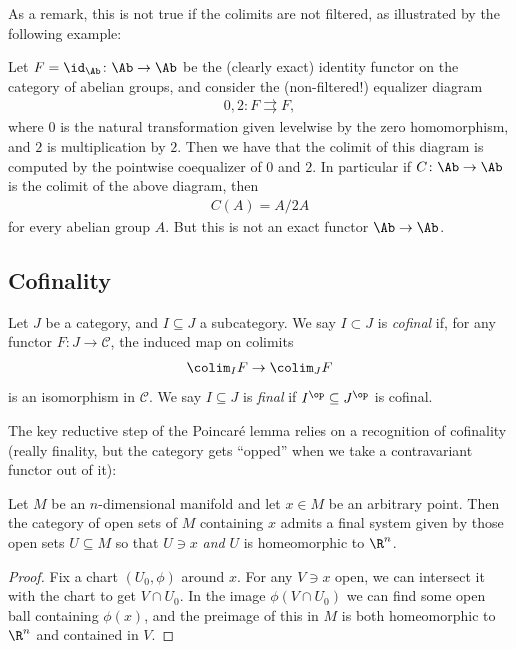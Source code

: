 \documentclass[11pt]{amsart}
\begin{document}
As a remark, this is not true if the colimits are not filtered, as illustrated by the following example:

\begin{example} Let $F = \id_\Ab \colon \Ab \to \Ab$ be the (clearly exact) identity functor on the category of abelian groups, and consider the (non-filtered!) equalizer diagram
\begin{align*}
    0,2 \colon F \rightrightarrows F,
\end{align*}
where $0$ is the natural transformation given levelwise by the zero homomorphism, and $2$ is multiplication by $2$. Then we have that the colimit of this diagram is computed by the pointwise coequalizer of $0$ and $2$. In particular if $C \colon \Ab \to \Ab$ is the colimit of the above diagram, then
\begin{align*}
    C(A) = A/2A
\end{align*}
for every abelian group $A$. But this is not an exact functor $\Ab \to \Ab$.
\end{example}


\subsection{Cofinality}

\begin{definition}\label{def:cofinal} Let $J$ be a category, and $I \subseteq J$ a subcategory. We say $I \subset J$ is \emph{cofinal} if, for any functor $F \colon J \to \mathscr{C}$, the induced map on colimits
\begin{align*}
    \colim_I F \to \colim_J F
\end{align*}
is an isomorphism in $\mathscr{C}$. We say $I \subseteq J$ is \emph{final} if $I^\op \subseteq J^\op$ is cofinal.
\end{definition}

The key reductive step of the Poincar\'e lemma relies on a recognition of cofinality (really finality, but the category gets ``opped'' when we take a contravariant functor out of it):

\begin{proposition}\label{prop:manifold-stalk-cofinal-system} Let $M$ be an $n$-dimensional manifold and let $x\in M$ be an arbitrary point. Then the category of open sets of $M$ containing $x$ admits a final system given by those open sets $U \subseteq M$ so that $U\ni x$ \emph{and} $U$ is homeomorphic to $\R^n$.
\end{proposition}
\begin{proof} Fix a chart $(U_0,\phi)$ around $x$. For any $V \ni x$ open, we can intersect it with the chart to get $V \cap U_0$. In the image $\phi(V\cap U_0)$ we can find some open ball containing $\phi(x)$, and the preimage of this in $M$ is both homeomorphic to $\R^n$ and contained in $V$.
\end{proof}
\end{document}
